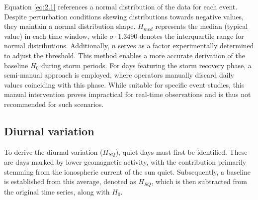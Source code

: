 \documentclass[12pt]{article}
\begin{document}
Equation \ref{eq:2.1} references a normal distribution of the data for each event. Despite perturbation conditions skewing distributions towards negative values, they maintain a normal distribution shape. $H_{med}$ represents the median (typical value) in each time window, while $\sigma \cdot 1.3490$ denotes the interquartile range for normal distributions. Additionally, $n$ serves as a factor experimentally determined to adjust the threshold. This method enables a more accurate derivation of the baseline $H_0$ during storm periods. For days featuring the storm recovery phase, a semi-manual approach is employed, where operators manually discard daily values coinciding with this phase. While suitable for specific event studies, this manual intervention proves impractical for real-time observations and is thus not recommended for such scenarios.\\

\subsection{Diurnal variation}
\label{S.4.2}
To derive the diurnal variation ($H_{SQ}$), quiet days must first be identified. These are days marked by lower geomagnetic activity, with the contribution primarily stemming from the ionospheric current of the sun quiet. Subsequently, a baseline is established from this average, denoted as $H_{SQ}$, which is then subtracted from the original time series, along with $H_0$.\\
\end{document}
